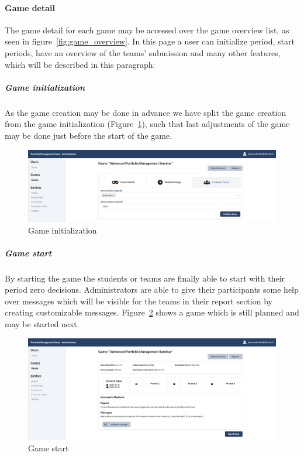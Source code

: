 \paragraph{Game detail}
The game detail for each game may be accessed over the game overview list, as seen in figure~\ref{fig:game_overview}. In this page a user can initialize period, start periods, have an overview of the teams' submission and many other features, which will be described in this paragraph:

\subparagraph{Game initialization}
As the game creation may be done in advance we have split the game creation from the game initialization (Figure~\ref{fig:game_initialization}), such that last adjustments of the game may be done just before the start of the game.
\begin{figure}[h!]
  \centering
  \includegraphics[scale=0.2]{img/application-overview/administrator/04_game_initialization.png}
  \caption{Game initialization}
  \label{fig:game_initialization}
\end{figure}

\subparagraph{Game start}
By starting the game the students or teams are finally able to start with their period zero decisions. Administrators are able to give their participants some help over messages which will be visible for the teams in their report section by creating customizable messages. Figure~\ref{fig:game_start} shows a game which is still planned and may be started next.
\begin{figure}[h!]
  \centering
  \includegraphics[scale=0.2]{img/application-overview/administrator/05_game_start.png}
  \caption{Game start}
  \label{fig:game_start}
\end{figure}


